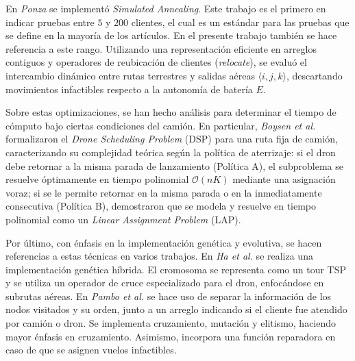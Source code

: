 En \textit{Ponza} \cite{ponza2016optimization} se implementó \textit{Simulated Annealing}. Este trabajo es el primero en indicar pruebas entre $5$ y $200$ clientes, el cual es un estándar para las pruebas que se define en la mayoría de los artículos. En el presente trabajo también se hace referencia a este rango. Utilizando una representación eficiente en arreglos contiguos y operadores de reubicación de clientes (\textit{relocate}), se evaluó el intercambio dinámico entre rutas terrestres y salidas aéreas $\langle i, j, k \rangle$, descartando movimientos infactibles respecto a la autonomía de batería $E$.


Sobre estas optimizaciones, se han hecho análisis para determinar el tiempo de cómputo bajo ciertas condiciones del camión. En particular, \textit{Boysen et al.} \cite{boysen2018drone} formalizaron el \textit{Drone Scheduling Problem} (DSP) para una ruta fija de camión, caracterizando su complejidad teórica según la política de aterrizaje: si el dron debe retornar a la misma parada de lanzamiento (Política A), el subproblema se resuelve óptimamente en tiempo polinomial $\mathcal{O}(nK)$ mediante una asignación voraz; si se le permite retornar en la misma parada o en la inmediatamente consecutiva (Política B), demostraron que se modela y resuelve en tiempo polinomial como un \textit{Linear Assignment Problem} (LAP).


Por último, con énfasis en la implementación genética y evolutiva, se hacen referencias a estas técnicas en varios trabajos. En \textit{Ha et al.} \cite{ha2020hybrid} se realiza una implementación genética híbrida. El cromosoma se representa como un tour TSP y se utiliza un operador de cruce especializado para el dron, enfocándose en subrutas aéreas. En \textit{Pambo et al.} \cite{pambo2024evolutionary} se hace uso de separar la información de los nodos visitados y su orden, junto a un arreglo indicando si el cliente fue atendido por camión o dron. Se implementa cruzamiento, mutación y elitismo, haciendo mayor énfasis en cruzamiento. Asimismo, incorpora una función reparadora en caso de que se asignen vuelos infactibles.

